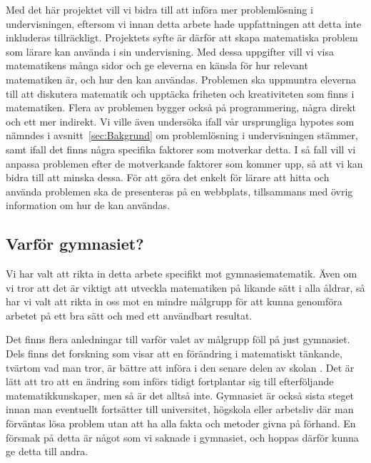 \textcolor{lila}{Med det här projektet vill vi bidra till att införa mer problemlösning i undervisningen, eftersom vi innan detta arbete hade uppfattningen att detta inte inkluderas tillräckligt. Projektets syfte är därför att skapa matematiska problem som lärare kan använda i sin undervisning. Med dessa uppgifter vill vi visa matematikens många sidor och ge eleverna en känsla för hur relevant matematiken är, och hur den kan användas. Problemen ska uppmuntra eleverna till att diskutera matematik och upptäcka friheten och kreativiteten som finns i matematiken. Flera av problemen bygger också på programmering, några direkt och ett mer indirekt. Vi ville även undersöka ifall vår ursprungliga hypotes som nämndes i avsnitt~\ref{sec:Bakgrund} om problemlösning i undervisningen stämmer, samt ifall det finns några specifika faktorer som motverkar detta. I så fall vill vi anpassa problemen efter de motverkande faktorer som kommer upp, så att vi kan bidra till att minska dessa. För att göra det enkelt för lärare att hitta och använda problemen ska de presenteras på en webbplats, tillsammans med övrig information om hur de kan användas.}


\subsection{Varför gymnasiet?}
\textcolor{lila}{
    Vi har valt att rikta in detta arbete specifikt mot gymnasiematematik. Även om vi tror att det är viktigt att utveckla matematiken på likande sätt i alla åldrar, så har vi valt att rikta in oss mot en mindre målgrupp för att kunna genomföra arbetet på ett bra sätt och med ett användbart resultat. }
    
\textcolor{lila}{
    Det finns flera anledningar till varför valet av målgrupp föll på just gymnasiet. Dels finns det forskning som visar att en förändring i matematiskt tänkande, tvärtom vad man tror, är bättre att införa i den senare delen av skolan \cite{TheElephant}. Det är lätt att tro att en ändring som införs tidigt fortplantar sig till efterföljande matematikkunskaper, men så är det alltså inte. Gymnasiet är också sista steget innan man eventuellt fortsätter till universitet, högskola eller arbetsliv där man förväntas lösa problem utan att ha alla fakta och metoder givna på förhand. En försmak på detta är något som vi saknade i gymnasiet, och hoppas därför kunna ge detta till andra.}
    
